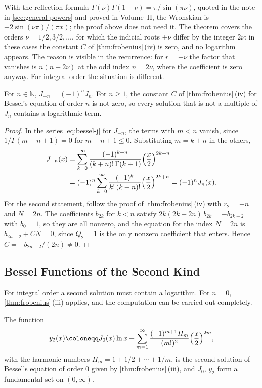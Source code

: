 With the reflection formula $\Gamma(\nu)\Gamma(1-\nu)=\pi/\sin(\pi\nu)$, quoted in the note in \cref{sec:general-powers} and proved in Volume~II, the Wronskian is $-2\sin(\nu\pi)/(\pi x)$; the proof above does not need it. The theorem covers the orders $\nu=1/2,3/2,\ldots$, for which the indicial roots $\pm\nu$ differ by the integer $2\nu$: in these cases the constant $C$ of \cref{thm:frobenius}\,(iv) is zero, and no logarithm appears. The reason is visible in the recurrence: for $r=-\nu$ the factor that vanishes is $n(n-2\nu)$ at the odd index $n=2\nu$, where the coefficient is zero anyway. For integral order the situation is different.

\begin{proposition}
\label{prop:bessel-negative-integer}
For $n\in\mathbb N$, $J_{-n}=(-1)^nJ_n$. For $n\ge1$, the constant $C$ of \cref{thm:frobenius}\,(iv) for Bessel's equation of order $n$ is not zero, so every solution that is not a multiple of $J_n$ contains a logarithmic term.
\end{proposition}

\begin{proof}
In the series \eqref{eq:bessel-j} for $J_{-n}$, the terms with $m<n$ vanish, since $1/\Gamma(m-n+1)=0$ for $m-n+1\le0$. Substituting $m=k+n$ in the others,
\begin{align*}
J_{-n}(x)&=\sum_{k=0}^\infty\frac{(-1)^{k+n}}{(k+n)!\,\Gamma(k+1)}\Bigl(\frac x2\Bigr)^{2k+n}\\
&=(-1)^n\sum_{k=0}^\infty\frac{(-1)^k}{k!\,(k+n)!}\Bigl(\frac x2\Bigr)^{2k+n}=(-1)^nJ_n(x).
\end{align*}
For the second statement, follow the proof of \cref{thm:frobenius}\,(iv) with $r_2=-n$ and $N=2n$. The coefficients $b_{2k}$ for $k<n$ satisfy $2k(2k-2n)\,b_{2k}=-b_{2k-2}$ with $b_0=1$, so they are all nonzero, and the equation for the index $N=2n$ is $b_{2n-2}+CN=0$, since $Q_2=1$ is the only nonzero coefficient that enters. Hence $C=-b_{2n-2}/(2n)\ne0$.
\end{proof}

\subsection{Bessel Functions of the Second Kind}

For integral order a second solution must contain a logarithm. For $n=0$, \cref{thm:frobenius}\,(iii) applies, and the computation can be carried out completely.

\begin{proposition}
\label{prop:bessel-y0}
The function
\[
y_2(x)\coloneqq J_0(x)\ln x+\sum_{m=1}^\infty\frac{(-1)^{m+1}H_m}{(m!)^2}\Bigl(\frac x2\Bigr)^{2m},
\]
with the harmonic numbers $H_m=1+1/2+\cdots+1/m$, is the second solution of Bessel's equation of order $0$ given by \cref{thm:frobenius}\,(iii), and $J_0$, $y_2$ form a fundamental set on $(0,\infty)$.
\end{proposition}


